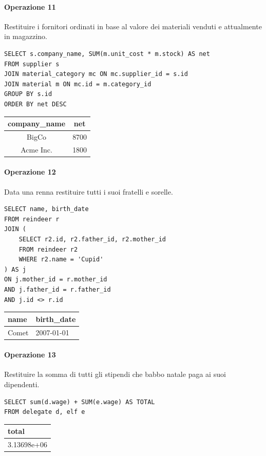 \documentclass[12pt]{report}
\begin{document}
\paragraph{Operazione 11} Restituire i fornitori ordinati in base al valore dei materiali venduti e attualmente in magazzino.
\begin{lstlisting}
SELECT s.company_name, SUM(m.unit_cost * m.stock) AS net
FROM supplier s
JOIN material_category mc ON mc.supplier_id = s.id
JOIN material m ON mc.id = m.category_id
GROUP BY s.id
ORDER BY net DESC
\end{lstlisting}
\begin{center}
  \begin{tabular}{|c|c|}
  \hline
  company\_name & net \\ \hline
  BigCo & 8700 \\ \hline
  Acme Inc. & 1800 \\ \hline
  \end{tabular}
\end{center}



\paragraph{Operazione 12} Data una renna restituire tutti i suoi fratelli e sorelle.
\begin{lstlisting}
SELECT name, birth_date
FROM reindeer r 
JOIN (
	SELECT r2.id, r2.father_id, r2.mother_id
	FROM reindeer r2 
	WHERE r2.name = 'Cupid'
) AS j
ON j.mother_id = r.mother_id 
AND j.father_id = r.father_id  
AND j.id <> r.id
\end{lstlisting}
\begin{center}
\begin{tabular}{|l|l|}
\hline
name & birth\_date \\ \hline
Comet & 2007-01-01 \\ \hline
\end{tabular}
\end{center}

\paragraph{Operazione 13} Restituire la somma di tutti gli stipendi che babbo 
natale paga ai suoi dipendenti.
\begin{lstlisting}
SELECT sum(d.wage) + SUM(e.wage) AS TOTAL
FROM delegate d, elf e
\end{lstlisting}
\begin{center}
\begin{tabular}{|l|}
\hline
total \\ \hline
3.13698e+06 \\ \hline
\end{tabular}
\end{center}
\end{document}
